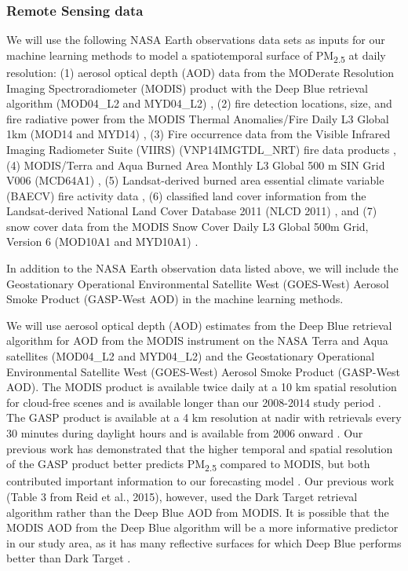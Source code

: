 \documentclass[authoryear]{elsarticle}
\begin{document}
\subsubsection{Remote Sensing data} %

We will use the following NASA Earth observations data sets as inputs for our machine learning methods to model a spatiotemporal surface of PM\textsubscript{2.5} at daily resolution: 
(1) aerosol optical depth (AOD) data from the MODerate Resolution Imaging Spectroradiometer (MODIS) product with the Deep Blue retrieval algorithm (MOD04\_L2 and MYD04\_L2) \citep{Sayer2013}, 
(2) fire detection locations, size, and fire radiative power from the MODIS Thermal Anomalies/Fire Daily L3 Global 1km (MOD14 and MYD14) \citep{Giglio2006}, 
(3) Fire occurrence data from the Visible Infrared Imaging Radiometer Suite (VIIRS) (VNP14IMGTDL\_NRT) fire data products \citep{Schroeder2014}, 
(4) MODIS/Terra and Aqua Burned Area Monthly L3 Global 500 m SIN Grid V006 (MCD64A1) \citep{MODISBurnArea}, 
(5) Landsat-derived burned area essential climate variable (BAECV) fire activity data \citep{Hawbaker2017}, 
(6) classified land cover information from the Landsat-derived National Land Cover Database 2011 (NLCD 2011) \citep{Homer2017}, and 
(7) snow cover data from the MODIS Snow Cover Daily L3 Global 500m Grid, Version 6 (MOD10A1 and MYD10A1) \citep{Hall2016}.

In addition to the NASA Earth observation data listed above, we will include the Geostationary Operational Environmental Satellite West (GOES-West) Aerosol Smoke Product (GASP-West AOD) \citep{GASPAerosolProduct2017} in the machine learning methods. 

We will use aerosol optical depth (AOD) estimates from the Deep Blue retrieval algorithm for AOD from the MODIS instrument on the NASA Terra and Aqua satellites (MOD04\_L2 and MYD04\_L2) \citep{Sayer2013} and the Geostationary Operational Environmental Satellite West (GOES-West) Aerosol Smoke Product (GASP-West AOD). The MODIS product is available twice daily at a 10 km spatial resolution for cloud-free scenes and is available longer than our 2008-2014 study period \citep{MODISMOD04L22017,MODISMYD04L22017}. The GASP product is available at a 4 km resolution at nadir with retrievals every 30 minutes during daylight hours and is available from 2006 onward 
\citep{GASPAerosolProduct2017}. Our previous work has demonstrated that the higher temporal and spatial resolution of the GASP product better predicts PM\textsubscript{2.5} compared to MODIS, but both contributed important information to our forecasting model \citep{Reid2015}. Our previous work (Table 3 from Reid et al., 2015), however, used the Dark Target retrieval algorithm rather than the Deep Blue AOD from MODIS. It is possible that the MODIS AOD from the Deep Blue algorithm will be a more informative predictor in our study area, as it has many reflective surfaces for which Deep Blue performs better than Dark Target \citep{NASADarkTarget2017}. 
\end{document}
